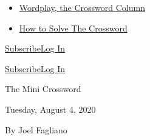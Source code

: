 \begin{itemize}
\tightlist
\item
  \href{https://www.nytimes.com/column/wordplay}{Wordplay, the Crossword
  Column}
\item
  \href{https://www.nytimes.com/guides/crosswords/how-to-solve-a-crossword-puzzle}{How
  to Solve The Crossword}
\end{itemize}

\href{https://www.nytimes.com/subscription/games?campaignId=9HH7K}{Subscribe}\href{https://myaccount.nytimes.com/auth/login?application=crosswords\&asset=navigation-drawer\&client_id=games\&redirect_uri=\&response_type=cookie}{Log
In}

\href{https://www.nytimes.com/subscription/games?campaignId=9JF99}{Subscribe}\href{https://myaccount.nytimes.com/auth/login?application=crosswords\&asset=navigation-bar\&client_id=games\&redirect_uri=\&response_type=cookie}{Log
In}

The Mini Crossword

Tuesday, August 4, 2020

By Joel Fagliano

